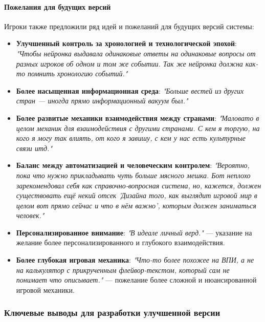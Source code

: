 \paragraph{Пожелания для будущих версий}

Игроки также предложили ряд идей и пожеланий для будущих версий системы:

\begin{itemize}
    \item \textbf{Улучшенный контроль за хронологией и технологической эпохой}: \textit{"{}Чтобы нейронка выдавала одинаковые ответы на одинаковые вопросы от разных игроков об одном и том же событии. Так же нейронка должна как-то помнить хронологию событий."{}}

    \item \textbf{Более насыщенная информационная среда}: \textit{"{}Больше вестей из других стран — иногда прямо информационный вакуум был."{}}

    \item \textbf{Более развитые механики взаимодействия между странами}: \textit{"{}Маловато в целом механик для взаимодействия с другими странами. С кем я торгую, на кого я могу так влиять, от кого я завишу, с кем у нас есть культурные связи итд."{}}

    \item \textbf{Баланс между автоматизацией и человеческим контролем}: \textit{"{}Вероятно, пока что нужно прикладывать чуть больше мясного мешка. Бот неплохо зарекомендовал себя как справочно-вопросная система, но, кажется, должен существовать ещё некий отсек 'Дизайна того, как выглядит игровой мир в целом вот прямо сейчас и что в нём важно', которым должен заниматься человек."{}}

    \item \textbf{Персонализированное внимание}: \textit{"{}В идеале личный верд."{}} — указание на желание более персонализированного и глубокого взаимодействия.

    \item \textbf{Более глубокая игровая механика}: \textit{"{}Что-то более похожее на ВПИ, а не на калькулятор с прикрученным флейвор-текстом, который сам не понимает что описывает."{}} — пожелание более сложной и нюансированной игровой механики.
\end{itemize}

\subsubsection{Ключевые выводы для разработки улучшенной версии}

